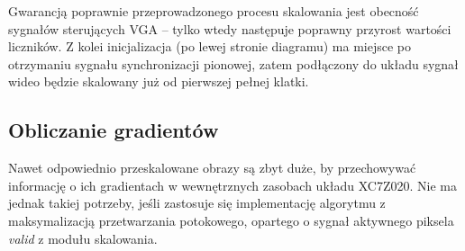 Gwarancją poprawnie przeprowadzonego procesu skalowania jest obecność sygnałów sterujących VGA -- tylko wtedy następuje poprawny przyrost wartości liczników. 
Z kolei inicjalizacja (po lewej stronie diagramu) ma miejsce po otrzymaniu sygnału synchronizacji pionowej, zatem podłączony do układu sygnał wideo będzie skalowany już od pierwszej pełnej klatki.


\subsection{Obliczanie gradientów}

Nawet odpowiednio przeskalowane obrazy są zbyt duże, by przechowywać informację o ich gradientach w wewnętrznych zasobach układu XC7Z020. %
Nie ma jednak takiej potrzeby, jeśli zastosuje się implementację algorytmu z maksymalizacją przetwarzania potokowego, opartego o sygnał aktywnego piksela \textit{valid} z modułu skalowania. %

